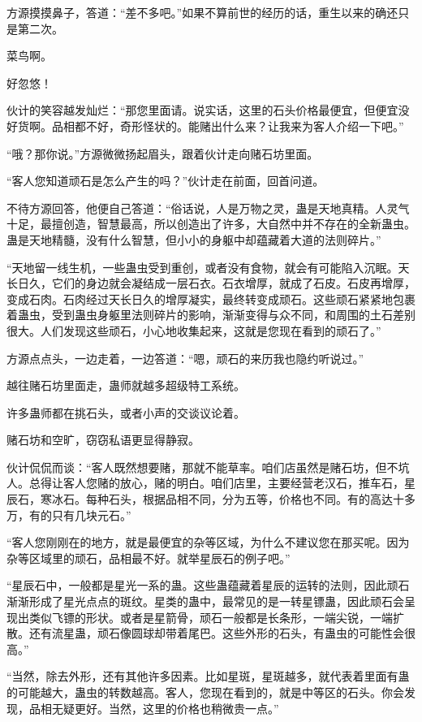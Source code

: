 \begin{this_body}
方源摸摸鼻子，答道：“差不多吧。”如果不算前世的经历的话，重生以来的确还只是第二次。

菜鸟啊。

好忽悠！

伙计的笑容越发灿烂：“那您里面请。说实话，这里的石头价格最便宜，但便宜没好货啊。品相都不好，奇形怪状的。能赌出什么来？让我来为客人介绍一下吧。”

“哦？那你说。”方源微微扬起眉头，跟着伙计走向赌石坊里面。

“客人您知道顽石是怎么产生的吗？”伙计走在前面，回首问道。

不待方源回答，他便自己答道：“俗话说，人是万物之灵，蛊是天地真精。人灵气十足，最擅创造，智慧最高，所以创造出了许多，大自然中并不存在的全新蛊虫。蛊是天地精髓，没有什么智慧，但小小的身躯中却蕴藏着大道的法则碎片。”

“天地留一线生机，一些蛊虫受到重创，或者没有食物，就会有可能陷入沉眠。天长日久，它们的身边就会凝结成一层石衣。石衣增厚，就成了石皮。石皮再增厚，变成石肉。石肉经过天长日久的增厚凝实，最终转变成顽石。这些顽石紧紧地包裹着蛊虫，受到蛊虫身躯里法则碎片的影响，渐渐变得与众不同，和周围的土石差别很大。人们发现这些顽石，小心地收集起来，这就是您现在看到的顽石了。”

方源点点头，一边走着，一边答道：“嗯，顽石的来历我也隐约听说过。”

越往赌石坊里面走，蛊师就越多超级特工系统。

许多蛊师都在挑石头，或者小声的交谈议论着。

赌石坊和空旷，窃窃私语更显得静寂。

伙计侃侃而谈：“客人既然想要赌，那就不能草率。咱们店虽然是赌石坊，但不坑人。总得让客人您赌的放心，赌的明白。咱们店里，主要经营老汉石，推车石，星辰石，寒冰石。每种石头，根据品相不同，分为五等，价格也不同。有的高达十多万，有的只有几块元石。”

“客人您刚刚在的地方，就是最便宜的杂等区域，为什么不建议您在那买呢。因为杂等区域里的顽石，品相最不好。就举星辰石的例子吧。”

“星辰石中，一般都是星光一系的蛊。这些蛊蕴藏着星辰的运转的法则，因此顽石渐渐形成了星光点点的斑纹。星类的蛊中，最常见的是一转星镖蛊，因此顽石会呈现出类似飞镖的形状。或者是星箭骨，顽石一般都是长条形，一端尖锐，一端扩散。还有流星蛊，顽石像圆球却带着尾巴。这些外形的石头，有蛊虫的可能性会很高。”

“当然，除去外形，还有其他许多因素。比如星斑，星斑越多，就代表着里面有蛊的可能越大，蛊虫的转数越高。客人，您现在看到的，就是中等区的石头。你会发现，品相无疑更好。当然，这里的价格也稍微贵一点。”


\end{this_body}
